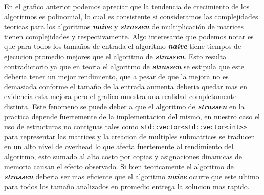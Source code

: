 \documentclass[11pt,spanish]{article} %
\begin{document}
En el grafico anterior podemos apreciar que la tendencia de crecimiento de los algoritmos es polinomial, lo cual es consistente si consideramos las  
  complejidades teoricas para los algoritmos \textbf{\textit{naive}} y \textbf{\textit{strassen}} de multiplicación 
  de matrices tienen complejidades  y  respectivamente.
  Algo interesante que podemos notar es que para todos los tamaños de entrada el algoritmo \textbf{\textit{naive}} 
  tiene tiempos de ejecucion promedio mejores que el algoritmo de \textbf{\textit{strassen}}.\newline
  Esto resulta contradictorio ya que en teoria el algoritmo de \textbf{\textit{strassen}} se estipula que este deberia 
  tener un mejor rendimiento, que a pesar de que la mejora no es demasiada conforme el tamaño de la entrada aumenta 
  deberia quedar mas en evidencia esta mejora pero el grafico muestra una realidad completamente distinta.\newline
  Este fenomeno se puede deber a que el algoritmo de \textbf{\textit{strassen}} en la practica depende fuertemente 
  de la implementacion del mismo, en nuestro caso el uso de estructuras no contiguas tales como \newline
  \verb|std::vector<std::vector<int>>| para representar las matrices y la creacion de multiples submatrices se traducen en un 
  alto nivel de overhead lo que afecta fuertemente al rendimiento del algoritmo, esto sumado al alto costo por copias y 
  asignaciones dinamicas de memoria causan el efecto observado.\newline
  Si bien teoricamente el algoritmo de \textbf{\textit{strassen}} deberia ser mas eficiente que el algoritmo 
  \textbf{\textit{naive}} ocurre que este ultimo para todos los tamaño analizados en promedio entrega la solucion mas 
  rapido.
\end{document}

